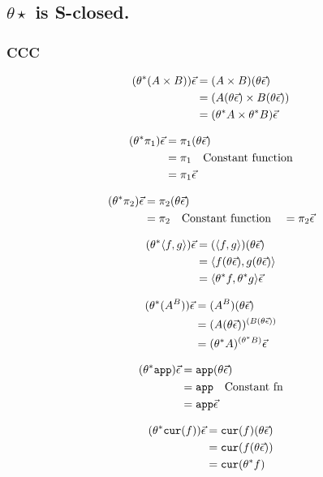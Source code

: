 \documentclass{report}
\begin{document}
\subsection{$\theta\star$ is S-closed.}

\subsubsection{CCC}

\begin{align}
    (\theta^*(A\times B))\vec{\epsilon} & = (A\times B)(\theta\vec{\epsilon})\\
    & = (A(\theta \vec{\epsilon})\times B(\theta\vec{\epsilon}))\\
    & = (\theta^* A\times \theta^* B)\vec{\epsilon}\\
\end{align}

\begin{align}
    (\theta^* \pi_1)\vec{\epsilon} & = \pi_1(\theta\vec{\epsilon})\\
    & = \pi_1 \quad\text{Constant function}\\
    & = \pi_1\vec{\epsilon}
\end{align}


\begin{align}
    (\theta^* \pi_2)\vec{\epsilon} & = \pi_2(\theta\vec{\epsilon})\\
    & = \pi_2 \quad\text{Constant function}\
    & = \pi_2\vec{\epsilon}
\end{align}

\begin{align}
    (\theta^*\langle f, g\rangle)\vec{\epsilon} & = (\langle f, g\rangle)(\theta\vec{\epsilon})\\
    & = \langle f(\theta\vec{\epsilon}), g(\theta\vec{\epsilon})\rangle\\
    &= \langle\theta^* f, \theta^* g\rangle\vec{\epsilon}
\end{align}

\begin{align}
    (\theta^*(A^B))\vec{\epsilon} & = (A^B)(\theta\vec{\epsilon})\\
     & = (A (\theta\vec{\epsilon}))^{(B (\theta\vec{\epsilon}))}\\
     & = (\theta^* A)^{(\theta^* B)}\vec{\epsilon}\\
\end{align}

\begin{align}
    (\theta^* \texttt{app})\vec{\epsilon} & = \texttt{app}(\theta\vec{\epsilon})\\
    & = \texttt{app} \quad\text{Constant fn}\\
    & = \texttt{app}\vec{\epsilon}
\end{align}

\begin{align}
    (\theta^*\texttt{cur}(f))\vec{\epsilon} & = \texttt{cur}(f)(\theta\vec{\epsilon})\\
    & = \texttt{cur}(f(\theta\vec{\epsilon}))\\
    & = \texttt{cur}(\theta^* f)
\end{align}
\end{document}
